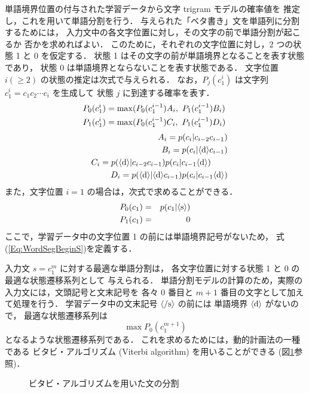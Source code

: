 単語境界位置の付与された学習データから文字 trigram モデルの確率値を
推定し，これを用いて単語分割を行う．
与えられた「ベタ書き」文を単語列に分割するためには，
入力文中の各文字位置に対し，その文字の前で単語分割が起こるか
否かを求めればよい．
このために，それぞれの文字位置に対し，2 つの状態 1 と 0 を仮定する．
状態 1 はその文字の前が単語境界となることを表す状態であり，
状態 0 は単語境界とならないことを表す状態である．
文字位置 $i (\ge 2)$ の状態の推定は次式で与えられる．
なお，$P_j(c_1^i)$ は文字列 $c_1^i = c_1 c_2 \cdots c_i$ を生成して
状態 $j$ に到達する確率を表す．
\begin{eqnarray}
\lefteqn{ P_0(c_1^i) = \max(P_0(c_1^{i-1}) A_i,~
	P_1(c_1^{i-1}) B_i)}
	\label{Eq:WordSegMainNoS}\\
\lefteqn{ P_1(c_1^i) = \max(P_0(c_1^{i-1}) C_i,~
	P_1(c_1^{i-1}) D_i)}
	\label{Eq:WordSegMainS}\\[3pt]
 & & A_i = p(c_i|c_{i-2}c_{i-1}) \nonumber\\
 & & B_i = p(c_i|\langle {\rm d}\rangle c_{i-1}) \nonumber\\
 & & C_i = p(\langle {\rm d}\rangle|c_{i-2}c_{i-1}) p(c_i|c_{i-1}\langle {\rm d}\rangle) \hspace{7mm}\nonumber\\
 & & D_i = p(\langle {\rm d}\rangle|\langle {\rm d}\rangle c_{i-1}) p(c_i|c_{i-1}\langle {\rm d}\rangle) \nonumber
\end{eqnarray}
また，文字位置 $i = 1$ の場合は，次式で求めることができる．
\begin{eqnarray}
P_0(c_1) &=& p(c_1|\langle {\rm s}\rangle)
        \label{Eq:WordSegBeginNoS}\\
P_1(c_1) &=& 0
        \label{Eq:WordSegBeginS}
\end{eqnarray}
ここで，学習データ中の文字位置 1 の前には単語境界記号がないため，
式(\ref{Eq:WordSegBeginS})を定義する．

入力文 $s = c_1^m$ に対する最適な単語分割は，
各文字位置に対する状態 1 と 0 の最適な状態遷移系列として
与えられる．
単語分割モデルの計算のため，実際の入力文には，文頭記号と文末記号を
各々 $0$ 番目と $m+1$ 番目の文字として加えて処理を行う．
学習データ中の文末記号 $\langle {\rm /s}\rangle$ の前には
単語境界 $\langle {\rm d}\rangle$ がないので，
最適な状態遷移系列は
\begin{equation}
\max P_0(c_1^{m+1})
\end{equation}
となるような状態遷移系列である．
これを求めるためには，動的計画法の一種である
ビタビ・アルゴリズム (Viterbi algorithm) を用いることができる
(図\ref{Fig:viterbi}参照)．
\begin{figure}[hbt]
\vspace{-2mm}
\begin{center}
\end{center}
\caption{ビタビ・アルゴリズムを用いた文の分割}
\label{Fig:viterbi}
\vspace{-6mm}
\end{figure}

